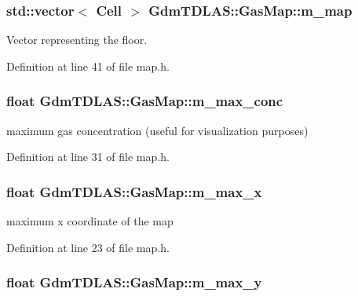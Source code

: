 \subsubsection[{m\_\-map}]{\setlength{\rightskip}{0pt plus 5cm}std::vector$<$ {\bf Cell} $>$ {\bf GdmTDLAS::GasMap::m\_\-map}\hspace{0.3cm}{\ttfamily  [private]}}\label{classGdmTDLAS_1_1GasMap_a7efbb6f5835713fe37dea1e9f7a37314}


Vector representing the floor. 



Definition at line 41 of file map.h.

\subsubsection[{m\_\-max\_\-conc}]{\setlength{\rightskip}{0pt plus 5cm}float {\bf GdmTDLAS::GasMap::m\_\-max\_\-conc}\hspace{0.3cm}{\ttfamily  [private]}}\label{classGdmTDLAS_1_1GasMap_a514016155a1e1f6aa3614e55adad6576}


maximum gas concentration (useful for visualization purposes) 



Definition at line 31 of file map.h.

\subsubsection[{m\_\-max\_\-x}]{\setlength{\rightskip}{0pt plus 5cm}float {\bf GdmTDLAS::GasMap::m\_\-max\_\-x}\hspace{0.3cm}{\ttfamily  [private]}}\label{classGdmTDLAS_1_1GasMap_aab6a559bbc7382030a99a58cc1e702bd}


maximum x coordinate of the map 



Definition at line 23 of file map.h.

\subsubsection[{m\_\-max\_\-y}]{\setlength{\rightskip}{0pt plus 5cm}float {\bf GdmTDLAS::GasMap::m\_\-max\_\-y}\hspace{0.3cm}{\ttfamily  [private]}}\label{classGdmTDLAS_1_1GasMap_a2f64ed720ec38700de09322270f6a284}


